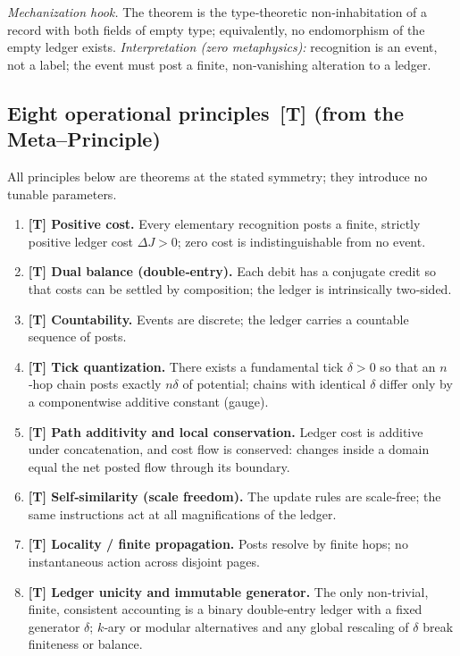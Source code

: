 \documentclass[11pt]{article}
\begin{document}
\noindent\textit{Mechanization hook.} The theorem is the type‑theoretic non‑inhabitation of a record with both fields of empty type; equivalently, no endomorphism of the empty ledger exists. \emph{Interpretation (zero metaphysics):} recognition is an event, not a label; the event must post a finite, non‑vanishing alteration to a ledger.


\subsection{Eight operational principles \,[T] (from the Meta–Principle)}
All principles below are theorems at the stated symmetry; they introduce no tunable parameters.
\begin{enumerate}
  \item \textbf{[T] Positive cost.} Every elementary recognition posts a finite, strictly positive ledger cost $\Delta J>0$; zero cost is indistinguishable from no event.
  \item \textbf{[T] Dual balance (double‑entry).} Each debit has a conjugate credit so that costs can be settled by composition; the ledger is intrinsically two‑sided.
  \item \textbf{[T] Countability.} Events are discrete; the ledger carries a countable sequence of posts.
  \item \textbf{[T] Tick quantization.} There exists a fundamental tick $\delta>0$ so that an $n$‑hop chain posts exactly $n\delta$ of potential; chains with identical $\delta$ differ only by a componentwise additive constant (gauge).
  \item \textbf{[T] Path additivity and local conservation.} Ledger cost is additive under concatenation, and cost flow is conserved: changes inside a domain equal the net posted flow through its boundary.
  \item \textbf{[T] Self‑similarity (scale freedom).} The update rules are scale‑free; the same instructions act at all magnifications of the ledger.
  \item \textbf{[T] Locality / finite propagation.} Posts resolve by finite hops; no instantaneous action across disjoint pages.
  \item \textbf{[T] Ledger unicity and immutable generator.} The only non‑trivial, finite, consistent accounting is a binary double‑entry ledger with a fixed generator $\delta$; $k$‑ary or modular alternatives and any global rescaling of $\delta$ break finiteness or balance.
\end{enumerate}
\end{document}
